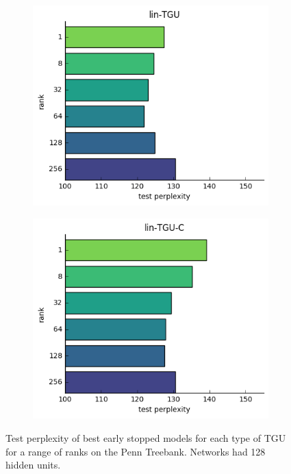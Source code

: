 \begin{figure}[ht]
\begin{subfigure}[t]{0.45\textwidth}
	\includegraphics[width=\textwidth]{exps/ptb/lintgu-rank}
\end{subfigure}\hfill
\begin{subfigure}[t]{0.45\textwidth}
	\includegraphics[width=\textwidth]{exps/ptb/lintguc-rank}
\end{subfigure}

\caption[TGU PTB results by rank]{Test perplexity
 of best early stopped models for
each type of TGU for a range of ranks on the Penn Treebank. Networks had 128 hidden units.}
\label{fig:ptbtgurank}
\end{figure}

